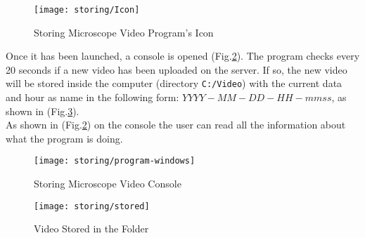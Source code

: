\begin{figure}[h]
	\begin{center}
		\texttt{[image: storing/Icon]}
		\caption{Storing Microscope Video Program's Icon}
		\label{Fig:icostoring}
	\end{center}
\end{figure}

Once it has been launched, a console is opened (Fig.\ref{Fig:storingwindows}). The program checks every 20 seconds if a new video has been uploaded on the server. If so, the new video will be stored inside the computer (directory \texttt{C:/Video}) with the current data and hour as name in the following form: $YYYY-MM-DD-HH-mmss$, as shown in (Fig.\ref{Fig:stored}).\\

As shown in (Fig.\ref{Fig:storingwindows}) on the console the user can read all the information about what the program is doing.

\begin{figure}[h]
	\begin{center}
		\texttt{[image: storing/program-windows]}
		\caption{Storing Microscope Video Console}
		\label{Fig:storingwindows}
	\end{center}
\end{figure}

\begin{figure}[h]
	\begin{center}
		\texttt{[image: storing/stored]}
		\caption{Video Stored in the Folder}
		\label{Fig:stored}
	\end{center}
\end{figure}
 
 
